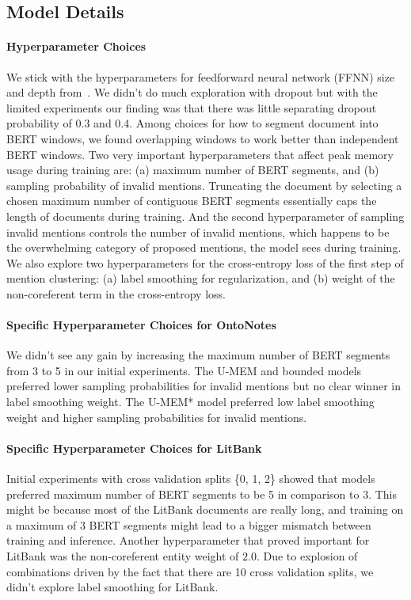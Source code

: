 \documentclass[11pt,a4paper]{article}
\newcommand{\unbounded}{U-MEM\xspace}
\begin{document}
\subsection{Model Details}
\label{sec:app_hyperparam}

\paragraph{Hyperparameter Choices}
We stick with the hyperparameters for feedforward neural network (FFNN) size and depth from~\citet{joshi2020span}. We didn't do much exploration with dropout but with the limited experiments our finding was that there was little separating dropout probability of 0.3 and 0.4. Among choices for how to segment document into BERT windows, we found overlapping windows to work better than independent BERT windows. Two very important hyperparameters that affect peak memory usage during training are: (a) maximum number of BERT segments, and (b) sampling probability of invalid mentions. Truncating the document by selecting a chosen maximum number of contiguous BERT segments essentially caps the length of documents during training. And the second hyperparameter of sampling invalid mentions  controls the number of invalid mentions, which happens to be the overwhelming category of proposed mentions, the model sees during training. We also explore two hyperparameters for the cross-entropy loss of the first step of mention clustering: (a) label smoothing for regularization, and (b) weight of the non-coreferent term in the cross-entropy loss. 




\paragraph{Specific Hyperparameter Choices for OntoNotes}
We didn't see any gain by increasing the maximum number of BERT segments from 3 to 5 in our initial experiments. The \unbounded and bounded models preferred lower sampling probabilities for invalid mentions but no clear winner in label smoothing weight. The U-MEM* model preferred low label smoothing weight and higher sampling probabilities for invalid mentions. 


\paragraph{Specific Hyperparameter Choices for LitBank}
Initial experiments with cross validation splits \{0, 1, 2\} showed that models preferred maximum number of BERT segments to be 5 in comparison to 3. This might be because most of the LitBank documents are really long, and training on a maximum of 3 BERT segments might lead to a bigger mismatch between training and inference. 
Another hyperparameter that proved important for LitBank was the non-coreferent entity weight of $2.0$. Due to explosion of combinations driven by the fact that there are 10 cross validation splits, we didn't explore label smoothing for LitBank. 
\end{document}
